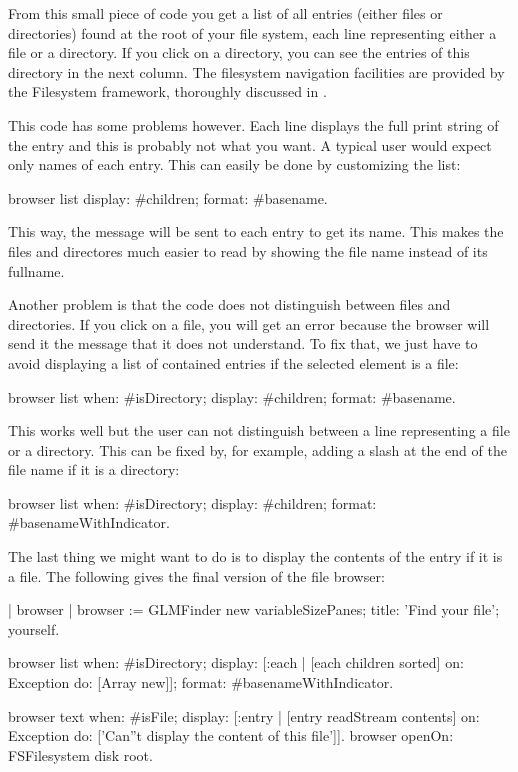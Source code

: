 \documentclass[a4paper,10pt,twoside]{book}
\begin{document}
From this small piece of code you get a list of all entries (either
files or directories) found at the root of your file system, each line
representing either a file or a directory. If you click on a
directory, you can see the entries of this directory in the next
column. The filesystem navigation facilities are provided by the
Filesystem framework, thoroughly discussed in .

This code has some problems however. Each line displays the full print
string of the entry and this is probably not what you want. A typical
user would expect only names of each entry. This can easily be done by
customizing the list:

\begin{code}{}
browser list
  display: #children;
  format: #basename.
\end{code}

This way, the message  will be sent to each entry to get its
name. This makes the files and directores much easier to read by showing the file name instead of its fullname.

Another problem is that the code does not distinguish between files
and directories. If you click on a file, you will get an error because
the browser will send it the message  that it does not
understand. To fix that, we just have to avoid displaying a list of
contained entries if the selected element is a file:

\begin{code}{}
browser list
  when: #isDirectory;
  display: #children;
  format: #basename.
\end{code}

This works well but the user can not distinguish between a line
representing a file or a directory. This can be fixed by, for example,
adding a slash at the end of the file name if it is a directory:

\begin{code}{}
browser list
  when: #isDirectory;
  display: #children;
  format: #basenameWithIndicator.
\end{code}

The last thing we might want to do is to display the contents of the
entry if it is a file. The following gives the final version of the
file browser:

\begin{code}{}
| browser |
browser := GLMFinder new
  variableSizePanes;
  title: 'Find your file';
  yourself.

browser list
  when: #isDirectory;
  display: [:each | [each children sorted]
                       on: Exception
                       do: [Array new]];
  format: #basenameWithIndicator.

browser text
  when: #isFile;
  display: [:entry | [entry readStream contents]
                        on: Exception
                        do: ['Can''t display the content of this file']].
browser openOn: FSFilesystem disk root.
\end{code}
\end{document}
